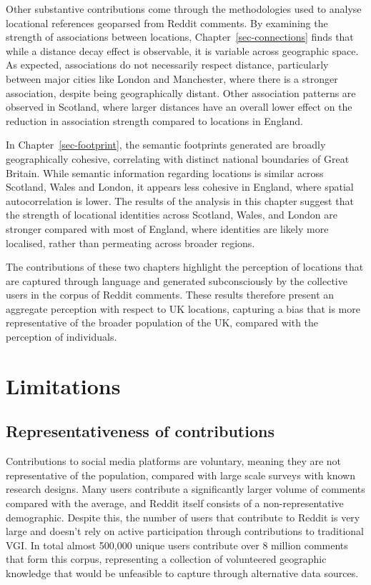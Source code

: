 \documentclass[
  letterpaper,
  11pt,
  english,
  onehalfspacing,
  headsepline]{MastersDoctoralThesis}
\begin{document}
Other substantive contributions come through the methodologies used to
analyse locational references geoparsed from Reddit comments. By
examining the strength of associations between locations,
Chapter~\ref{sec-connections} finds that while a distance decay effect
is observable, it is variable across geographic space. As expected,
associations do not necessarily respect distance, particularly between
major cities like London and Manchester, where there is a stronger
association, despite being geographically distant. Other association
patterns are observed in Scotland, where larger distances have an
overall lower effect on the reduction in association strength compared
to locations in England.

In Chapter~\ref{sec-footprint}, the semantic footprints generated are
broadly geographically cohesive, correlating with distinct national
boundaries of Great Britain. While semantic information regarding
locations is similar across Scotland, Wales and London, it appears less
cohesive in England, where spatial autocorrelation is lower. The results
of the analysis in this chapter suggest that the strength of locational
identities across Scotland, Wales, and London are stronger compared with
most of England, where identities are likely more localised, rather than
permeating across broader regions.

The contributions of these two chapters highlight the perception of
locations that are captured through language and generated
subconsciously by the collective users in the corpus of Reddit comments.
These results therefore present an aggregate perception with respect to
UK locations, capturing a bias that is more representative of the
broader population of the UK, compared with the perception of
individuals.

\hypertarget{sec-limitations}{%
\section{Limitations}\label{sec-limitations}}

\hypertarget{representativeness-of-contributions}{%
\subsection{Representativeness of
contributions}\label{representativeness-of-contributions}}

Contributions to social media platforms are voluntary, meaning they are
not representative of the population, compared with large scale surveys
with known research designs. Many users contribute a significantly
larger volume of comments compared with the average, and Reddit itself
consists of a non-representative demographic. Despite this, the number
of users that contribute to Reddit is very large and doesn't rely on
active participation through contributions to traditional VGI. In total
almost 500,000 unique users contribute over 8 million comments that form
this corpus, representing a collection of volunteered geographic
knowledge that would be unfeasible to capture through alternative data
sources.
\end{document}
